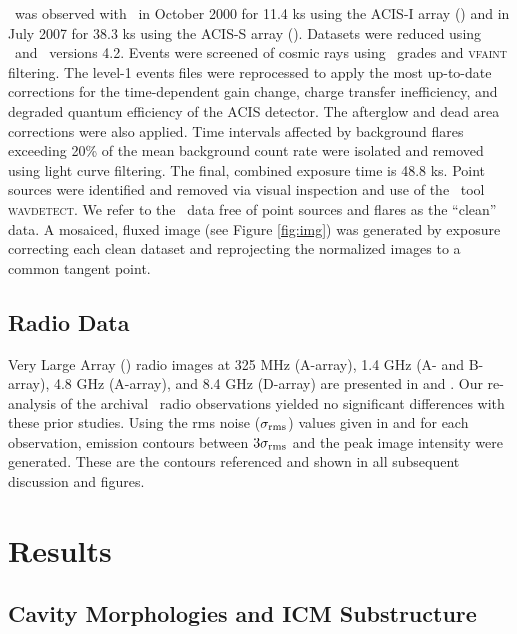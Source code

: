 \documentclass[11pt, preprint]{aastex}
\begin{document}
\rbs\ was observed with \cxo\ in October 2000 for 11.4 ks using the
ACIS-I array () and in
July 2007 for 38.3 ks using the ACIS-S array (). Datasets were reduced using
\ciao\ and \caldb\ versions 4.2. Events were screened of cosmic rays
using \asca\ grades and {\textsc{vfaint}} filtering. The level-1
events files were reprocessed to apply the most up-to-date corrections
for the time-dependent gain change, charge transfer inefficiency, and
degraded quantum efficiency of the ACIS detector. The afterglow and
dead area corrections were also applied. Time intervals affected by
background flares exceeding 20\% of the mean background count rate
were isolated and removed using light curve filtering. The final,
combined exposure time is 48.8 ks. Point sources were identified and
removed via visual inspection and use of the \ciao\ tool
{\textsc{wavdetect}}. We refer to the \cxo\ data free of point sources
and flares as the ``clean'' data. A mosaiced, fluxed image (see Figure
\ref{fig:img}) was generated by exposure correcting each clean dataset
and reprojecting the normalized images to a common tangent point.

\subsection{Radio Data}
\label{sec:radio}

Very Large Array (\vla) radio images at 325 MHz (A-array), 1.4 GHz (A-
and B-array), 4.8 GHz (A-array), and 8.4 GHz (D-array) are presented
in \citet{gitti06} and \citet{birzan08}. Our re-analysis of the
archival \vla\ radio observations yielded no significant differences
with these prior studies. Using the rms noise ($\sigma_{\rm{rms}}$)
values given in \citet{gitti06} and \citet{birzan08} for each
observation, emission contours between $3\sigma_{\rm{rms}}$ and the
peak image intensity were generated. These are the contours referenced
and shown in all subsequent discussion and figures.

\section{Results}
\label{sec:results}

\subsection{Cavity Morphologies and ICM Substructure}
\label{sec:morph}
\end{document}
